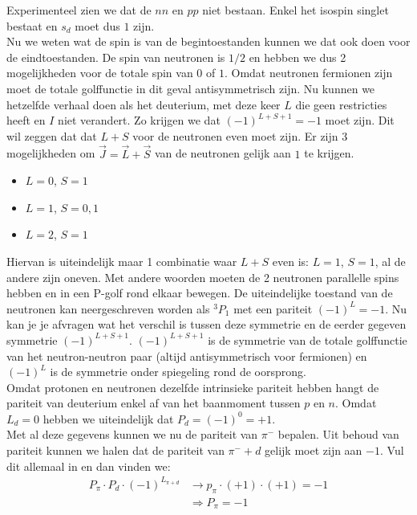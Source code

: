 \documentclass[../main.tex]{subfiles}
\begin{document}
Experimenteel zien we dat de $nn$ en $pp$ niet bestaan. Enkel het isospin singlet bestaat en $s_d$ moet dus $1$ zijn.\\
Nu we weten wat de spin is van de begintoestanden kunnen we dat ook doen voor de eindtoestanden. De spin van neutronen is $1/2$ en hebben we dus 2 mogelijkheden voor de totale spin van $0$ of $1$. Omdat neutronen fermionen zijn moet de totale golffunctie in dit geval antisymmetrisch zijn. Nu kunnen we hetzelfde verhaal doen als het deuterium, met deze keer $L$ die geen restricties heeft en $I$ niet verandert. Zo krijgen we dat $(-1)^{L+S+1}=-1$ moet zijn. Dit wil zeggen dat dat $L+S$ voor de neutronen even moet zijn. Er zijn 3 mogelijkheden om $\vec{J}=\vec{L}+\vec{S}$ van de neutronen gelijk aan $1$ te krijgen.
\begin{itemize}
    \item $L=0$, $S=1$
    \item $L=1$, $S=0,1$
    \item $L=2$, $S=1$
\end{itemize}
Hiervan is uiteindelijk maar 1 combinatie waar $L+S$ even is: $L=1$, $S=1$, al de andere zijn oneven. Met andere woorden moeten de 2 neutronen parallelle spins hebben en in een P-golf rond elkaar bewegen. De uiteindelijke toestand van de neutronen kan neergeschreven worden als $^3P_1$ met een pariteit $(-1)^L = -1$. Nu kan je je afvragen wat het verschil is tussen deze symmetrie en de eerder gegeven symmetrie $(-1)^{L+S+1}$. $(-1)^{L+S+1}$ is de symmetrie van de totale golffunctie van het neutron-neutron paar (altijd antisymmetrisch voor fermionen) en $(-1)^L$ is de symmetrie onder spiegeling rond de oorsprong.\\
Omdat protonen en neutronen dezelfde intrinsieke pariteit hebben hangt de pariteit van deuterium enkel af van het baanmoment tussen $p$ en $n$. Omdat $L_d=0$ hebben we uiteindelijk dat $P_d=(-1)^0=+1$.\\
Met al deze gegevens kunnen we nu de pariteit van $\pi^-$ bepalen. Uit behoud van pariteit kunnen we halen dat de pariteit van $\pi^-+d$ gelijk moet zijn aan $-1$. Vul dit allemaal in en dan vinden we:
\begin{equation}
    \begin{aligned}
        \label{eq:par_pi_-}
        P_\pi\cdot P_d\cdot (-1)^{L_{\pi+d}} &\rightarrow p_\pi\cdot (+1) \cdot (+1) = -1\\
                                             &\Rightarrow P_\pi=-1
    \end{aligned}
\end{equation}
\end{document}
